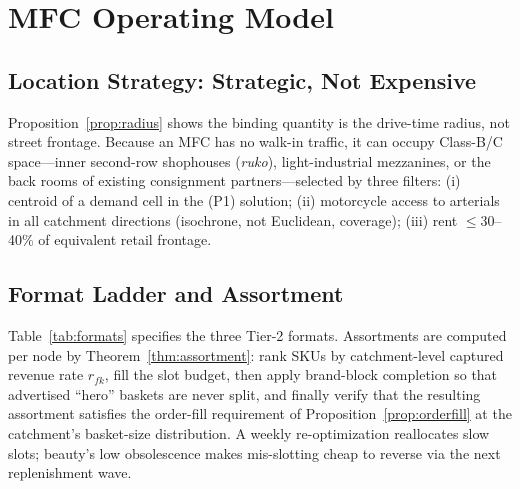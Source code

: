 \section{MFC Operating Model}\label{sec:mfc}

\subsection{Location Strategy: Strategic, Not Expensive}
Proposition~\ref{prop:radius} shows the binding quantity is the drive-time radius, not street frontage. Because an MFC has no walk-in traffic, it can occupy Class-B/C space---inner second-row shophouses (\emph{ruko}), light-industrial mezzanines, or the back rooms of existing consignment partners---selected by three filters: (i) centroid of a demand cell in the (P1) solution; (ii) motorcycle access to arterials in all catchment directions (isochrone, not Euclidean, coverage); (iii) rent $\le30$--40\% of equivalent retail frontage. 

\subsection{Format Ladder and Assortment}
Table~\ref{tab:formats} specifies the three Tier-2 formats. Assortments are computed per node by Theorem~\ref{thm:assortment}: rank SKUs by catchment-level captured revenue rate $r_{fk}$, fill the slot budget, then apply brand-block completion so that advertised ``hero'' baskets are never split, and finally verify that the resulting assortment satisfies the order-fill requirement of Proposition~\ref{prop:orderfill} at the catchment's basket-size distribution. A weekly re-optimization reallocates slow slots; beauty's low obsolescence makes mis-slotting cheap to reverse via the next replenishment wave.

